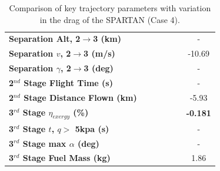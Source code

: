\begin{table}[ht!]
\begin{tabular}{l c c c c c c}
		\textbf{Separation Alt, 2$\rightarrow$3 (km)}
		& \secondthirdSeparationAltCdNinetyNoReturn
		& \secondthirdSeparationAltCdNinetyFiveNoReturn
		& \secondthirdSeparationAltCdStandardNoReturn
		& \secondthirdSeparationAltCdOneHundredFiveNoReturn
		& \secondthirdSeparationAltCdOneHundredTenNoReturn
		& -
		\\
		\textbf{Separation $v$, 2$\rightarrow$3 (m/s)}
		& \secondthirdSeparationvCdNinetyNoReturn
		& \secondthirdSeparationvCdNinetyFiveNoReturn
		& \secondthirdSeparationvCdStandardNoReturn
		& \secondthirdSeparationvCdOneHundredFiveNoReturn
		& \secondthirdSeparationvCdOneHundredTenNoReturn
		&-10.69
		\\
		\textbf{Separation $\gamma$, 2$\rightarrow$3 (deg)}
		& \secondthirdSeparationgammaCdNinetyNoReturn
		& \secondthirdSeparationgammaCdNinetyFiveNoReturn
		& \secondthirdSeparationgammaCdStandardNoReturn
		& \secondthirdSeparationgammaCdOneHundredFiveNoReturn
		& \secondthirdSeparationgammaCdOneHundredTenNoReturn
		& -
		\\
		\textbf{2$^{nd}$ Stage Flight Time (s)}
		& \secondFlightTimeCdNinetyNoReturn
		& \secondFlightTimeCdNinetyFiveNoReturn
		& \secondFlightTimeCdStandardNoReturn
		& \secondFlightTimeCdOneHundredFiveNoReturn
		& \secondFlightTimeCdOneHundredTenNoReturn
		& -
		\\
		\textbf{2$^{nd}$ Stage Distance Flown (km)}
		& \SecondDistCdNinetyNoReturn
		& \SecondDistCdNinetyFiveNoReturn
		& \SecondDistCdStandardNoReturn
		& \SecondDistCdOneHundredFiveNoReturn
		& \SecondDistCdOneHundredTenNoReturn
		&-5.93
		\\
		\hline 
		\textbf{3$^{rd}$ Stage $\eta_{exergy}$ (\%)}
		& \textbf{\thirddExergyEffCdNinetyNoReturn}
		& \textbf{\thirddExergyEffCdNinetyFiveNoReturn}
		& \textbf{\thirddExergyEffCdStandardNoReturn}
		& \textbf{\thirddExergyEffCdOneHundredFiveNoReturn}
		& \textbf{\thirddExergyEffCdOneHundredTenNoReturn}
		& \textbf{-0.181}
		\\

		\textbf{3$^{rd}$ Stage $t$, $q >$ 5kpa (s)}
		& \thirdqOverFiveCdNinetyNoReturn
		& \thirdqOverFiveCdNinetyFiveNoReturn
		& \thirdqOverFiveCdStandardNoReturn
		& \thirdqOverFiveCdOneHundredFiveNoReturn
		& \thirdqOverFiveCdOneHundredTenNoReturn
		& -
		\\
		\textbf{3$^{rd}$ Stage max $\alpha$ (deg)}
		& \thirdmaxAoACdNinetyNoReturn
		& \thirdmaxAoACdNinetyFiveNoReturn
		& \thirdmaxAoACdStandardNoReturn
		& \thirdmaxAoACdOneHundredFiveNoReturn
		& \thirdmaxAoACdOneHundredTenNoReturn
		& -
		\\
		\textbf{3$^{rd}$ Stage Fuel Mass (kg)}
		& \thirdmFuelCdNinetyNoReturn
		& \thirdmFuelCdNinetyFiveNoReturn
		& \thirdmFuelCdStandardNoReturn
		& \thirdmFuelCdOneHundredFiveNoReturn
		& \thirdmFuelCdOneHundredTenNoReturn
		&1.86
		\\
		\hline 
	\end{tabular} 
	\caption{Comparison of key trajectory parameters with variation in the drag of the SPARTAN (Case 4).}
	\label{tab:DragVariationNoReturn}
\end{table}

